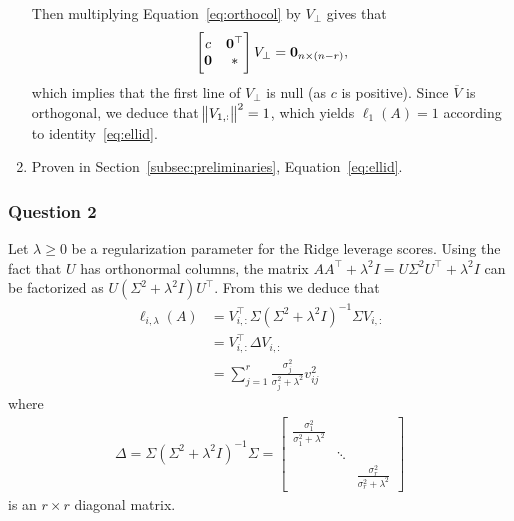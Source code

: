 \documentclass{article}
\begin{document}
\begin{enumerate}[label=\alph*)]
  Then multiplying Equation~\eqref{eq:orthocol} by $V_\bot$ gives that
  \begin{align*}
    \begin{bmatrix*}
      c & \zeros^\top\\
      \zeros & *
    \end{bmatrix*} V_\bot = \zeros_{n \times (n - r)},
  \end{align*}
  which implies that the first line of $V_\bot$ is null (as $c$ is positive).
  Since $\overline{V}$ is orthogonal, we deduce that $\norm{V_{1,:}}^2 = 1$,
  which yields $\ell_1(A) = 1$ according to identity~\eqref{eq:ellid}.
\item Proven in Section~\ref{subsec:preliminaries}, Equation~\eqref{eq:ellid}.
\end{enumerate}

\subsubsection{Question 2}\label{subsubsec:q2}

Let $\lambda \geq 0$  be a regularization parameter for the Ridge
leverage scores.
Using the fact that $U$ has orthonormal columns, the matrix $A A^\top +
\lambda^2 I = U \Sigma^2 U^\top + \lambda^2 I$ can be factorized as $U\left(
  \Sigma^2 + \lambda^2 I \right) U^\top$.
From this we deduce that
\begin{align*}
  \ell_{i,\lambda}(A) &= V_{i,:}^\top \Sigma \left( \Sigma^2 + \lambda^2 I \right)^{-1} \Sigma V_{i,:}\\
                      &= V_{i,:}^\top \Delta V_{i,:}\\
                      &= \sum_{j = 1}^r \frac{\sigma_j^2}{\sigma_j^2 + \lambda^2} v_{ij}^2
\end{align*}
where
\begin{align*}
  \Delta = \Sigma \left( \Sigma^2 + \lambda^2 I \right)^{-1} \Sigma =
  \begin{bmatrix}
    \frac{\sigma_1^2}{\sigma_1^2 + \lambda^2} & & \\
    & \ddots & \\
    & & \frac{\sigma_r^2}{\sigma_r^2 + \lambda^2}
  \end{bmatrix}
\end{align*}
is an $r \times r$ diagonal matrix.
\end{document}
